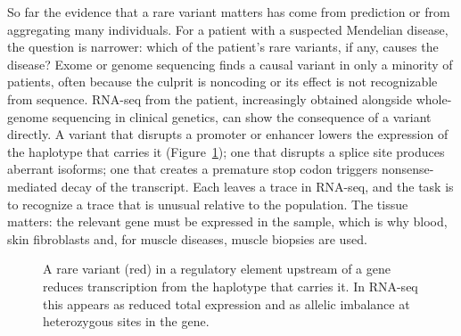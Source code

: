 So far the evidence that a rare variant matters has come from prediction or from aggregating many individuals. For a patient with a suspected Mendelian disease, the question is narrower: which of the patient's rare variants, if any, causes the disease? Exome or genome sequencing finds a causal variant in only a minority of patients, often because the culprit is noncoding or its effect is not recognizable from sequence. RNA-seq from the patient, increasingly obtained alongside whole-genome sequencing in clinical genetics, can show the consequence of a variant directly. A variant that disrupts a promoter or enhancer lowers the expression of the haplotype that carries it (Figure~\ref{fig:reg_variant}); one that disrupts a splice site produces aberrant isoforms; one that creates a premature stop codon triggers nonsense-mediated decay of the transcript. Each leaves a trace in RNA-seq, and the task is to recognize a trace that is unusual relative to the population. The tissue matters: the relevant gene must be expressed in the sample, which is why blood, skin fibroblasts and, for muscle diseases, muscle biopsies are used.

\begin{figure}[!htbp]
  \centering
  \caption{A rare variant (red) in a regulatory element upstream of a gene reduces transcription from the haplotype that carries it. In RNA-seq this appears as reduced total expression and as allelic imbalance at heterozygous sites in the gene.}
  \label{fig:reg_variant}
\end{figure}

